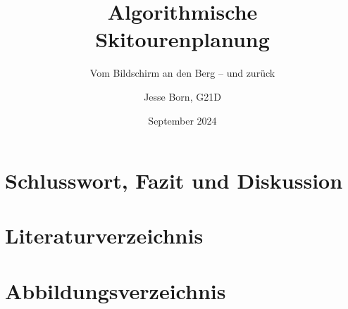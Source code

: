 \documentclass[a4paper]{scrarticle}
\title{\AKAfont\Huge\textcolor{AKSAcolor}{Algorithmische\\Skitourenplanung}}
\subtitle{Vom Bildschirm an den Berg – und zurück}
\author{Jesse Born, G21D}
\date{September 2024}
\begin{document}

\maketitle


\tableofcontents









\section{Schlusswort, Fazit und Diskussion}
\lipsum[6-10]
\clearpage
\section{Literaturverzeichnis}
\lipsum[6-10]
\clearpage
\section{Abbildungsverzeichnis}
\lipsum[6-10]
\clearpage
\end{document}
